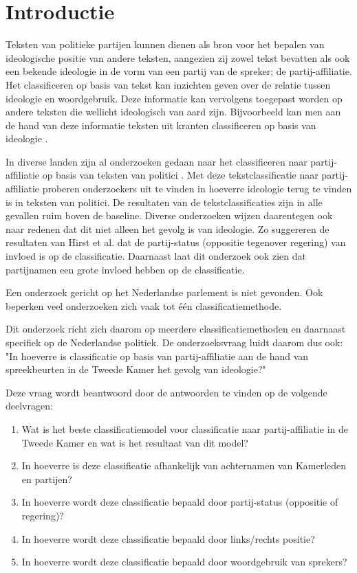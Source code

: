 \section{Introductie}
\label{sec:intro}
Teksten van politieke partijen kunnen dienen als bron voor het bepalen van ideologische positie van andere teksten, aangezien zij zowel tekst bevatten als ook een bekende ideologie in de vorm van een partij van de spreker; de partij-affiliatie. Het classificeren op basis van tekst kan inzichten geven over de relatie tussen ideologie en woordgebruik. Deze informatie kan vervolgens toegepast worden op andere teksten die wellicht ideologisch van aard zijn. Bijvoorbeeld kan men aan de hand van deze informatie teksten uit kranten classificeren op basis van ideologie \cite{DBLP:journals/corr/Biessmann16,Hirst_textto}.\par
In diverse landen zijn al onderzoeken gedaan naar het classificeren naar partij-affiliatie op basis van teksten van politici \cite{DBLP:journals/corr/Biessmann16,Ferreira2016UsingTT}. Met deze tekstclassificatie naar partij-affiliatie proberen onderzoekers uit te vinden in hoeverre ideologie terug te vinden is in teksten van politici. De resultaten van de tekstclassificaties zijn in alle gevallen ruim boven de baseline. Diverse onderzoeken wijzen daarentegen ook naar redenen dat dit niet alleen het gevolg is van ideologie. Zo suggereren de  resultaten van Hirst et al. \cite{Hirst_textto} dat de partij-status (oppositie tegenover regering) van invloed is op de classificatie. Daarnaast laat dit onderzoek ook zien dat partijnamen een grote invloed hebben op de classificatie.\par
Een onderzoek gericht op het Nederlandse parlement is niet gevonden. Ook beperken veel onderzoeken zich vaak tot één classificatiemethode.\par
Dit onderzoek richt zich daarom op meerdere classificatiemethoden en daarnaast specifiek op de Nederlandse politiek. De onderzoeksvraag luidt daarom dus ook: "In hoeverre is classificatie op basis van partij-affiliatie aan de hand van spreekbeurten in de Tweede Kamer het gevolg van ideologie?"\par
Deze vraag wordt beantwoord door de antwoorden te vinden op de volgende deelvragen:
\begin{enumerate}
    \item Wat is het beste classificatiemodel voor classificatie naar partij-affiliatie in de Tweede Kamer en wat is het resultaat van dit model?
    \item In hoeverre is deze classificatie afhankelijk van achternamen van Kamerleden en partijen?
    \item In hoeverre wordt deze classificatie bepaald door partij-status (oppositie of regering)?
    \item In hoeverre wordt deze classificatie bepaald door links/rechts positie?
    \item In hoeverre wordt deze classificatie bepaald door woordgebruik van sprekers?
\end{enumerate}
